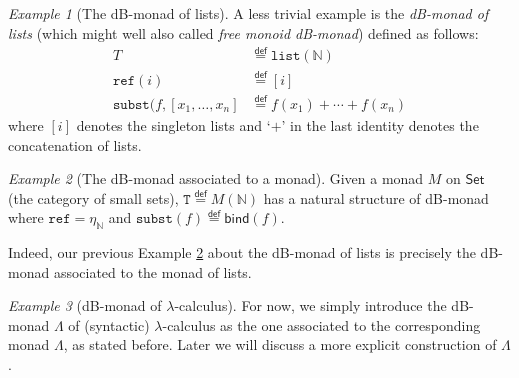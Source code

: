 \documentclass[a4paper,twoside,12pt]{article}
\theoremstyle{definition}
\theoremstyle{remark}
\theoremstyle{example}
\newtheorem{example}{Example}
\newcommand{\NN}{\mathbb{N}}
\newcommand{\TT}{\mathtt{T}}
\newcommand{\subst}{\mathtt{subst}}
\newcommand{\refe}{\mathtt{ref}}
\begin{document}
\begin{example}[The dB-monad of lists]
  A less trivial example is the \emph{dB-monad of lists} (which might
  well also called \emph{free monoid dB-monad}) defined as follows:
  \begin{align*}
    T &\stackrel{\mathsf{def}}{=}\mathtt{list}(\NN) \\
    \refe(i) &\stackrel{\mathsf{def}}{=} [i] \\
    \subst(f,[x_1, \dots, x_n] &\stackrel{\mathsf{def}}{=} f(x_1) + \cdots + f(x_n)
  \end{align*}
  where $[i]$ denotes the singleton lists and `$+$' in the last
  identity denotes the concatenation of lists.
\end{example}

\begin{example}[The dB-monad associated to a monad]
  \label{ex:list-db-monad}
  Given a monad $M$ on $\mathsf{Set}$ (the category of small sets),
  $\TT \stackrel{\mathsf{def}}{=} M(\NN)$ has a natural structure of
  dB-monad where $\refe = \eta_\NN$ and
  $\subst(f) \stackrel{\mathsf{def}}{=} \mathsf{bind}(f)$.
\end{example}

Indeed, our previous Example \ref{ex:list-db-monad} about the dB-monad
of lists is precisely the dB-monad associated to the monad of lists.







\begin{example}[dB-monad of $\lambda$-calculus]
  For now, we simply introduce the dB-monad $\mathsf{\Lambda}$ of
  (syntactic) $\lambda$-calculus as the one associated to the
  corresponding monad $\Lambda$, as stated before.  Later we will
  discuss a more explicit construction of $\mathtt{\Lambda}$.
\end{example}
\end{document}
